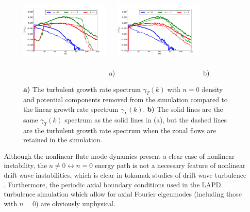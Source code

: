 \documentclass[twocolumn,showpacs,preprintnumbers,amsmath,amssymb]{revtex4}
\begin{document}
\begin{figure}
\includegraphics[width=0.40\textwidth,height=50mm]{non0_vs_lin}~a)
\hfil
\includegraphics[width=0.40\textwidth,height=50mm]{non0_vs_withzf}~b)
\hfil
\caption{\textbf{a)} The turbulent growth rate spectrum $\gamma_T(k)$ with $n=0$ density and potential components removed from the 
simulation compared to the linear growth rate spectrum $\gamma_L(k)$.
\textbf{b)} The solid lines are the same $\gamma_T(k)$ spectrum as the solid lines in (a), but the dashed lines are the turbulent growth rate spectrum when the zonal flows are retained
in the simulation.}
\label{gamma_no_n0_figs}
\end{figure}


Although the nonlinear flute mode dynamics present a clear case of nonlinear instability, the $n \ne 0 \leftrightarrow n=0$ energy path is not a necessary feature of nonlinear drift wave
instabilities, which is clear in tokamak studies of drift wave turbulence \cite{zeiler1996,zeiler1997,scott2002,scott2003,scott2005}. Furthermore, the periodic axial boundary conditions
used in the LAPD turbulence simulation which allow for axial Fourier eigenmodes (including those with $n=0$) are obviously unphysical. 
\end{document}
